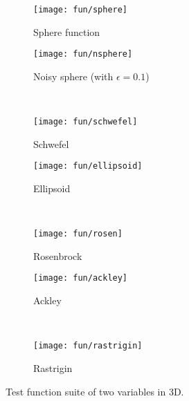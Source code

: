 \begin{figure}\centering
	\begin{subfigure}{0.37\textwidth}
		\centering\texttt{[image: fun/sphere]}
		\caption{Sphere function}\label{fig:fun:sphere}
	\end{subfigure}
	\quad
	\begin{subfigure}{0.37\textwidth}
		\centering\texttt{[image: fun/nsphere]}
		\caption{Noisy sphere (with $\epsilon=0.1$)}\label{fig:fun:nsphere}
	\end{subfigure}
	\\
	\begin{subfigure}{0.37\textwidth}
		\centering\texttt{[image: fun/schwefel]}
		\caption{Schwefel}\label{fig:fun:schwefel}
	\end{subfigure}
	\quad
	\begin{subfigure}{0.37\textwidth}
		\centering\texttt{[image: fun/ellipsoid]}
		\caption{Ellipsoid}\label{fig:fun:ellipsoid}
	\end{subfigure}
	\\
	\begin{subfigure}{0.37\textwidth}
		\centering\texttt{[image: fun/rosen]}
		\caption{Rosenbrock}\label{fig:fun:rosen}
	\end{subfigure}
	\quad
	\begin{subfigure}{0.37\textwidth}
		\centering\texttt{[image: fun/ackley]}
		\caption{Ackley}\label{fig:fun:ackley}
	\end{subfigure}
	\\
	\begin{subfigure}{0.37\textwidth}
		\centering\texttt{[image: fun/rastrigin]}
		\caption{Rastrigin}\label{fig:fun:rastrigin}
	\end{subfigure}
	\caption{Test function suite of two variables in 3D.}
\end{figure}





